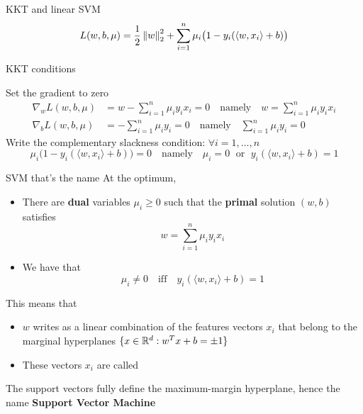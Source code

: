 \documentclass[xcolor={usenames,dvipsnames}]{beamer}
\begin{document}
\begin{frame}{KKT and linear SVM}
  \begin{equation*}
    L(w, b, \mu) = \frac 12 \left\| w \right\|_2^2 + \sum_{i=1}^n \mu_i \big(1 - y_i( \langle {w, x_i} \rangle  + b) \big)
  \end{equation*}

  \begin{block}{KKT conditions}
  
    Set the gradient to zero
    \begin{align*}
      \nabla_w L(w, b, \mu) &= w - \sum_{i=1}^n \mu_i y_i x_i = 0 \quad \text{namely} \quad w = \sum_{i=1}^n \mu_i y_i x_i \\
      \nabla_b L(w, b, \mu) &= -\sum_{i=1}^n \mu_i y_i = 0 \quad \text{namely} \quad \sum_{i=1}^n \mu_i y_i =0
    \end{align*}
    Write the complementary slackness condition: $\forall i=1,\hdots,n$
    \begin{equation*}
      \mu_i \big(1 - y_i(\langle {w, x_i} \rangle + b) \big) = 0 \quad \text{namely} \quad \mu_i = 0 \; \text{ or } \; y_i(\langle {w, x_i} \rangle  + b) = 1
    \end{equation*} 
    \end{block}
\end{frame}


    



\begin{frame}{SVM that's the name}
At the optimum,
\begin{itemize}
  \item There are \textbf{dual} variables $\mu_i \geq 0$ such that the \textbf{primal} solution $(w, b)$ satisfies
\begin{equation*}
    w = \sum_{i=1}^n \mu_i y_i x_i
\end{equation*}
\item We have that
  \begin{equation*}
      \mu_i \neq 0 \quad \text{iff} \quad y_i (\langle {w, x_i} \rangle  + b) = 1
  \end{equation*}
\end{itemize}
\pause 
This means that
\begin{itemize}
    \item $w$ writes as a linear combination of the features vectors $x_i$ that belong to the marginal hyperplanes $\{ x \in \mathbb{R}^d : w^T x + b = \pm 1 \}$
\item These vectors $x_i$ are called 
\end{itemize}


\medskip
The support vectors fully define the maximum-margin hyperplane, hence the name 
\textbf{\alert{Support Vector Machine}}
\end{frame}
\end{document}
